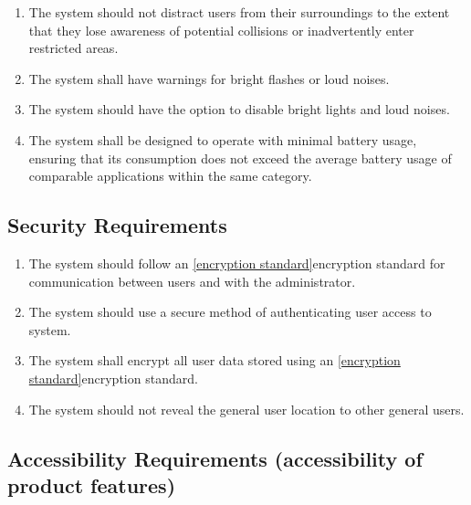 \documentclass{article}
\begin{document}
\begin{enumerate}[label=\textbf{SAR-\arabic*},ref=SAR-\arabic*]
    \item \label{SAR-1} The system should not distract users from their surroundings to the extent that they lose awareness of potential collisions or inadvertently enter restricted areas. \\
    \item \label{SAR-2} The system shall have warnings for bright flashes or loud noises. \\
    \item \label{SAR-3} The system should have the option to disable bright lights and loud noises. \\
    \item \label{SAR-4} The system shall be designed to operate with minimal battery usage, ensuring that its consumption does not exceed the average battery usage of comparable applications within the same category. \\
\end{enumerate}

\subsection{Security Requirements}

\begin{enumerate}[label=\textbf{SER-\arabic*},ref=SER-\arabic*]
    \item \label{SER-1} The system should follow an \ref{encryption standard}encryption standard for communication between users and with the administrator. \\
    \item \label{SER-2} The system should use a secure method of authenticating user access to system. \\
    \item \label{SER-3} The system shall encrypt all user data stored using an \ref{encryption standard}encryption standard. \\
    \item \label{SER-4} The system should not reveal the general user location to other general users. \\
\end{enumerate}

\subsection{Accessibility Requirements (accessibility of product features)}
\end{document}
